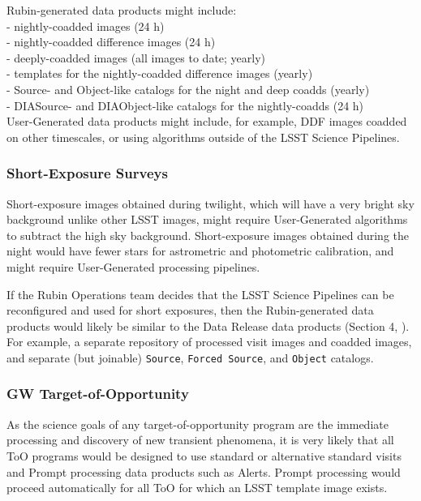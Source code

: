 \documentclass[DM,lsstdoc,toc]{lsstdoc}
\begin{document}
Rubin-generated data products might include:\\
 - nightly-coadded images (24 h)\\
 - nightly-coadded difference images (24 h)\\
 - deeply-coadded images (all images to date; yearly)\\
 - templates for the nightly-coadded difference images (yearly)\\
 - Source- and Object-like catalogs for the night and deep coadds (yearly)\\
 - DIASource- and DIAObject-like catalogs for the nightly-coadds (24 h)\\

User-Generated data products might include, for example, DDF images coadded on other timescales, or using algorithms outside of the LSST Science Pipelines.

\subsubsection{Short-Exposure Surveys}

Short-exposure images obtained during twilight, which will have a very bright sky background unlike other LSST images, might require User-Generated algorithms to subtract the high sky background. 
Short-exposure images obtained during the night would have fewer stars for astrometric and photometric calibration, and might require User-Generated processing pipelines.

If the Rubin Operations team decides that the LSST Science Pipelines can be reconfigured and used for short exposures, then the Rubin-generated data products would likely be similar to the Data Release data products (Section 4, ).
For example, a separate repository of processed visit images and coadded images, and separate (but joinable) {\tt Source}, {\tt Forced Source}, and {\tt Object} catalogs.

\subsubsection{GW Target-of-Opportunity}

As the science goals of any target-of-opportunity program are the immediate processing and discovery of new transient phenomena, it is very likely that all ToO programs would be designed to use standard or alternative standard visits and Prompt processing data products such as Alerts.
Prompt processing would proceed automatically for all ToO for which an LSST template image exists.
\end{document}
